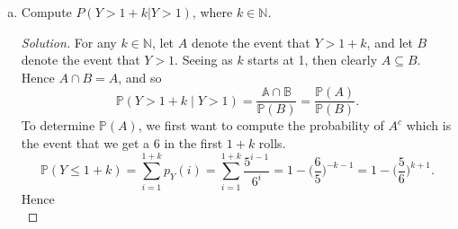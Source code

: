 \documentclass[12pt]{article}
\newenvironment{solution}
{\renewcommand\qedsymbol{$\blacksquare$}\begin{proof}[Solution]}
{\end{proof}}
\begin{document}
\begin{enumerate}
\begin{enumerate}[(a)]
\begin{solution}
                        it follows that the probability of rolling a non-six
                        value $k-1$ times in a row, followed by a 6 on the
                        $k$th roll has probability 
                        \begin{equation*}
                            p_Y(k)=\bigg(\frac{5}{6}\bigg)^{k-1}\bigg(\frac{1}{6}\bigg)
                            =\frac{5^{k-1}}{6^k}.
                        \end{equation*}
                        Note that for all $k\in\{1, 2, \dots, \}$, $0\leq
                        p_Y(k)\leq 1$, and 
                        \begin{equation*}
                            \sum_{k=1}^{\infty}p_Y(k)=\sum_{k=1}^{\infty}\frac{5^{k-1}}{6^k}=1.
                        \end{equation*}
                        This shows that $p_Y(k)$ satisfies both conditions of
                        a pmf. 
                    \end{solution}
                \item Compute $P(Y>1+k|Y>1)$, where $k\in\mathbb{N}$.
                    \begin{solution}
                        For any $k\in\mathbb{N}$, let $A$ denote the event that
                        $Y>1+k$, and let $B$ denote the event that $Y>1$.
                        Seeing as $k$ starts at 1, then clearly $A\subseteq B$.
                        Hence $A\cap B = A$, and so 
                        \begin{equation*}
                            \mathbb{P}(Y>1+k\mid Y>1)=\frac{\mathbb{A\cap
                            B}}{\mathbb{P}(B)}=\frac{\mathbb{P}(A)}{\mathbb{P}(B)}.
                        \end{equation*}
                        To determine $\mathbb{P}(A)$, we first want to compute the
                        probability of $A^c$ which is the event that we get
                        a 6 in the first $1+k$ rolls. 
                        \begin{equation*}
                            \mathbb{P}(Y\leq
                            1+k)=\sum_{i=1}^{1+k}p_Y(i)=
                            \sum_{i=1}^{1+k}\frac{5^{i-1}}{6^i}=1-\bigg(\frac{6}{5}\bigg)^{-k-1}
                            =1-\bigg(\frac{5}{6}\bigg)^{k+1}.
                        \end{equation*}
                        Hence
                        \begin{equation*}

\end{equation*}
\end{solution}
\end{enumerate}
\end{enumerate}
\end{document}
